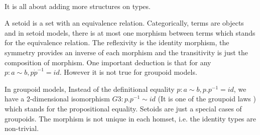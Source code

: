 \begin{code}
\\
\>[12]\<[18]%
\>[18]     \AgdaFunction{<}    \AgdaFunction{>}  \AgdaFunction{<}    \AgdaFunction{>}\AgdaSymbol{)}\<%
\\
\>[12]\<[18]%
\>[18] \AgdaFunction{<}    \AgdaFunction{>}\<%
\\
\>[0]\<[12]%
\>[12]\AgdaSymbol{;}  \AgdaSymbol{=}          \<[48]%
\>[48]\<%
\\
\>[0]\<[20]%
\>[20]            \AgdaSymbol{(}  \AgdaSymbol{))))))}\<%
\\
\>[0]\<[12]%
\>[12]\AgdaSymbol{\}}\<%
\\
\end{code}











It is all about adding more structures on types. 

A setoid is a set with
an equivalence relation. Categorically, terms are objects and in setoid models, there is at most one morphism
between terms which stands for the equivalence relation.
The reflexivity is the identity morphism, the symmetry provides an
inverse of each morphism and the transitivity is just the composition
of morphism. One important deduction is that for any $p : a \sim b, p
\dot p^{-1} = id$. However it is not true for groupoid models.

In groupoid models, Instead of the definitional equality $p : a \sim
b, p . p^{-1} = id$, we have a 2-dimensional isomorphism $G3 : p . p^{-1}
\sim id$ (It is one of the groupoid laws \cite{MR1686862}) which
stands for the propositional equality.
Setoids are just a special cases of groupoids. The morphism is not
unique in each homset, i.e. the identity types are
non-trivial.

